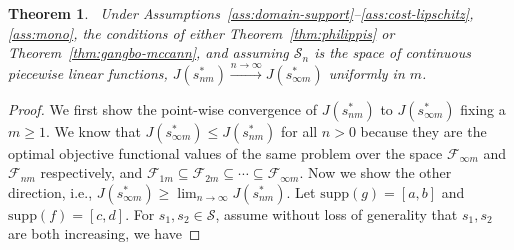 \documentclass[12pt,leqno]{amsart}
\newtheorem{theorem}{Theorem}
\begin{document}
\begin{theorem}~\label{thm:cp-conv-to-cpc} 
Under Assumptions~\ref{ass:domain-support}--\ref{ass:cost-lipschitz}, \ref{ass:mono}, the conditions of either Theorem~\ref{thm:philippis} or Theorem~\ref{thm:gangbo-mccann}, and assuming $\mathcal{S}_n$ is the space of continuous piecewise linear functions, $J(s_{nm}^*)\xrightarrow{n\rightarrow\infty}J(s_{\infty m}^*)$ uniformly in $m$.
\end{theorem}
\begin{proof}
We first show the point-wise convergence of $J(s_{nm}^*)$ to $J(s_{\infty m}^*)$ fixing a $m\geq 1$. We know that $J(s_{\infty m}^*)\leq J(s_{nm}^*)$ for all $n>0$ because they are the optimal objective functional values of the same problem over the space $\mathcal{F}_{\infty m}$ and $\mathcal{F}_{nm}$ respectively, and $\mathcal{F}_{1m}\subseteq\mathcal{F}_{2m}\subseteq\cdots\subseteq\mathcal{F}_{\infty m}$. Now we show the other direction, i.e., $J(s_{\infty m}^*)\geq \lim_{n\rightarrow\infty}J(s_{nm}^*)$. Let $\mathrm{supp}(g)= [a,b]$ and $\mathrm{supp}(f)= [c,d]$. For $s_1, s_2\in\mathcal{S}$, assume without loss of generality that $s_1, s_2$ are both increasing, we have


\end{proof}
\end{document}

